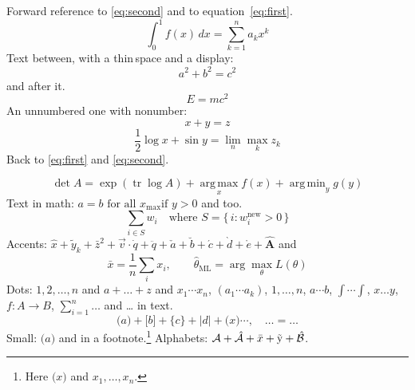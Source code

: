 \documentclass{article}
\DeclareMathOperator*{\argmin}{arg\,min}
\begin{document}
Forward reference to \eqref{eq:second} and to equation~\ref{eq:first}.
\begin{equation}\label{eq:first}
\int_0^1 f(x)\,dx = \sum_{k=1}^{n} a_k x^k
\end{equation}
Text between, with a thin\,space and a display:
\[ a^2 + b^2 = c^2 \]
and after it.
\begin{equation*}
E = mc^2
\end{equation*}
An unnumbered one with nonumber:
\begin{equation}
x + y = z \nonumber
\end{equation}
\begin{equation}
\frac{1}{2} \log x + \sin y = \lim_{n} \max_k z_k \label{eq:second}
\end{equation}
Back to \eqref{eq:first} and \eqref{eq:second}.

\[ \det A = \exp(\operatorname{tr} \log A) + \operatorname*{arg\,max}_x f(x) + \argmin_y g(y) \]
Text in math: $a = b \text{ for all } x_{\text{max}} \text{if $y>0$}$ and  too.
\[ \sum_{i\in S} w_i \quad\text{where } S = \{\,i : w_i^{\text{new}} > 0\,\} \]
Accents: $\hat{x} + \tilde{y}_k + \bar{z}^2 + \vec{v} \cdot \dot{q} + \ddot{q} + \check{a} + \breve{b} + \acute{c} + \grave{d} + \mathring{e} + \hat{\mathbf{A}}$ and
\[ \bar{x} = \frac{1}{n}\sum_i x_i, \qquad \hat{\theta}_{\text{ML}} = \arg\max_\theta L(\theta) \]
Dots: $1, 2, \dots, n$ and $a + \dots + z$ and $x_1 \cdots x_n$, $(a_1 \cdots a_k)$,
$1,\dotsc,n$, $a\dotsb b$, $\int\dotsi\int$, $x \dotso y$, $f\colon A \to B$, $\sum_{i=1}^{n} \dots$ and \ldots{} in text.
\[ \big( a \big) + \Big[ b \Big] + \bigg\{ c \bigg\} + \Bigg| d \Bigg| + \bigl( x \bigr) \cdots, \quad \dots = \dots \]
Small: {\small $\big( a \big)$} and in a footnote.\footnote{Here $\Big( x \Big)$ and $x_1, \dots, x_n$.}
Alphabets: $\mathcal{A} + \mathcal{\hat A} + \mathnormal{\bar x} + \mathrm{\tilde y} + \hat{\mathcal B}$.
\end{document}
